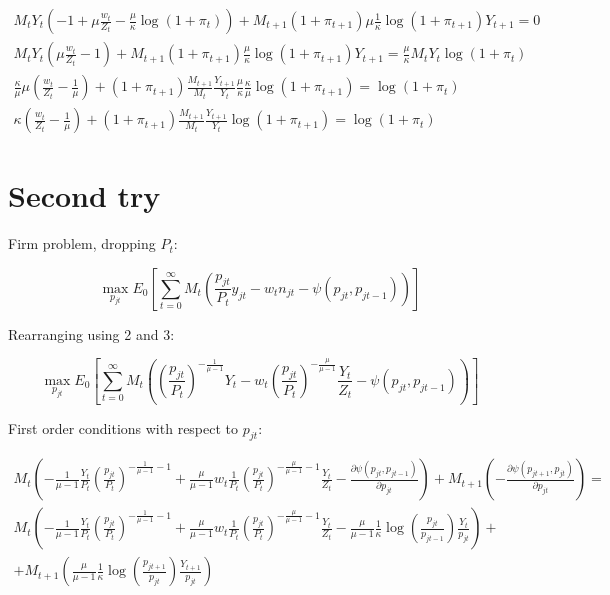 \documentclass[a4paper,10pt]{article}
\begin{document}
	\begin{gather}
		M_t Y_t \left(-1 + \mu\frac{w_t}{Z_t} - \frac{\mu}{\kappa}\log\left(1+\pi_t\right) \right) + M_{t+1}(1+\pi_{t+1})\mu\frac{1}{\kappa}\log\left(1+\pi_{t+1}\right) Y_{t+1} = 0 \nonumber \\
		M_t Y_t \left(\mu \frac{w_t}{Z_t} - 1\right) + M_{t+1} (1+\pi_{t+1})\frac{\mu}{\kappa} \log(1+\pi_{t+1})Y_{t+1} = \frac{\mu}{\kappa}M_t Y_t\log(1+\pi_{t}) \nonumber \\
		\frac{\kappa}{\mu}\mu\left(\frac{w_t}{Z_t} - \frac{1}{\mu}\right) + (1+\pi_{t+1})\frac{M_{t+1}}{M_t}\frac{Y_{t+1}}{Y_t} \frac{\mu}{\kappa}\frac{\kappa}{\mu}\log(1+\pi_{t+1}) = \log(1+\pi_t)\nonumber \\
		\kappa \left(\frac{w_t}{Z_t} - \frac{1}{\mu}\right) + (1+\pi_{t+1})\frac{M_{t+1}}{M_t}\frac{Y_{t+1}}{Y_t} \log(1+\pi_{t+1}) = \log(1+\pi_t)
	\end{gather}
	
	\section{Second try}
	
	Firm problem, dropping $P_t$:
	
	\begin{equation}
		\max_{p_{jt}} E_0\left[\sum_{t=0}^{\infty} M_t \left(\frac{p_{jt}}{P_t} y_{jt} - w_t n_{jt} - \psi(p_{jt},p_{jt-1})\right) \right]
	\end{equation}

	Rearranging using 2 and 3:
	
	\begin{equation}
		\max_{p_{jt}} E_0\left[\sum_{t=0}^{\infty} M_t \left(\left(\frac{p_{jt}}{P_t}\right)^{-\frac{1}{\mu-1}}Y_t - w_t \left(\frac{p_{jt}}{P_t}\right)^{-\frac{\mu}{\mu-1}}\frac{Y_t}{Z_t} - \psi(p_{jt},p_{jt-1})\right)\right]
	\end{equation}
	
	First order conditions with respect to $p_{jt}$:
	
	\begin{gather}
		M_t\left(-\frac{1}{\mu -1}\frac{Y_t}{P_t}\left(\frac{p_{jt}}{P_t}\right)^{-\frac{1}{\mu-1} -1} + \frac{\mu}{\mu-1} w_t \frac{1}{P_t}\left(\frac{p_{jt}}{P_t}\right)^{-\frac{\mu}{\mu-1} -1} \frac{Y_t}{Z_t} - \frac{\partial \psi(p_{jt},p_{jt-1})}{\partial p_{jt}}\right) + M_{t+1} \left(-\frac{\partial \psi(p_{jt+1},p_{jt})}{\partial p_{jt}}\right) = \\
		M_t\left(-\frac{1}{\mu -1}\frac{Y_t}{P_t}\left(\frac{p_{jt}}{P_t}\right)^{-\frac{1}{\mu-1} -1} + \frac{\mu}{\mu-1} w_t \frac{1}{P_t}\left(\frac{p_{jt}}{P_t}\right)^{-\frac{\mu}{\mu-1} -1} \frac{Y_t}{Z_t} - \frac{\mu}{\mu-1}\frac{1}{\kappa}\log\left(\frac{p_{jt}}{p_{jt-1}}\right) \frac{Y_t}{p_{jt}} \right) + \nonumber \\ 
		+ M_{t+1} \left(\frac{\mu}{\mu-1}\frac{1}{\kappa}\log\left(\frac{p_{jt+1}}{p_{jt}}\right) \frac{Y_{t+1}}{p_{jt}}\right)
	\end{gather}
\end{document}
